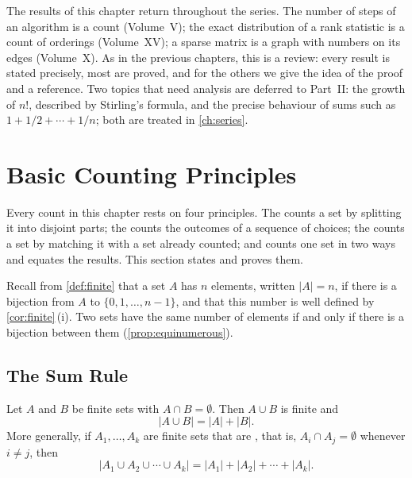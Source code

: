 The results of this chapter return throughout the series. The number of steps of an algorithm is a count (Volume~V); the exact distribution of a rank statistic is a count of orderings (Volume~XV); a sparse matrix is a graph with numbers on its edges (Volume~X). As in the previous chapters, this is a review: every result is stated precisely, most are proved, and for the others we give the idea of the proof and a reference. Two topics that need analysis are deferred to Part~II: the growth of $n!$, described by Stirling's formula, and the precise behaviour of sums such as $1+1/2+\cdots+1/n$; both are treated in \cref{ch:series}.

\section{Basic Counting Principles}
\label{sec:counting-principles}

Every count in this chapter rests on four principles. The  counts a set by splitting it into disjoint parts; the  counts the outcomes of a sequence of choices; the  counts a set by matching it with a set already counted; and  counts one set in two ways and equates the results. This section states and proves them.

Recall from \cref{def:finite} that a set $A$ has $n$ elements, written $|A|=n$, if there is a bijection from $A$ to $\{0,1,\ldots,n-1\}$, and that this number is well defined by \cref{cor:finite}\,(i). Two sets have the same number of elements if and only if there is a bijection between them (\cref{prop:equinumerous}).

\subsection{The Sum Rule}

\begin{theorem}
\label{thm:sum-rule}
Let $A$ and $B$ be finite sets with $A\cap B=\emptyset$. Then $A\cup B$ is finite and
\[
|A\cup B|=|A|+|B| .
\]
More generally, if $A_1,\ldots,A_k$ are finite sets that are , that is, $A_i\cap A_j=\emptyset$ whenever $i\ne j$, then
\[
|A_1\cup A_2\cup\cdots\cup A_k|=|A_1|+|A_2|+\cdots+|A_k| .
\]
\end{theorem}

